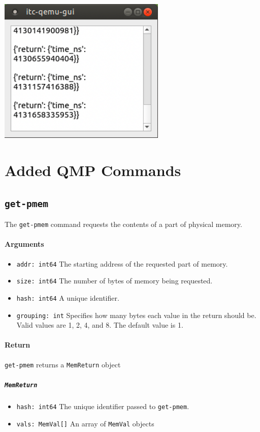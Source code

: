 \documentclass{article}
\newcommand{\code}[1]{\texttt{#1}}
\begin{document}
\begin{center}
    \includegraphics[width=80mm]{images/qmp-monitor-view.png}
\end{center}

\section{Added QMP Commands}

\subsection{\code{get-pmem}} \label{GetPmem}
The \code{get-pmem} command requests the contents of a part of physical memory.
\paragraph{Arguments}
\begin{itemize}
    \item \code{addr: int64}
        \subitem The starting address of the requested part of memory.
    \item \code{size: int64} 
        \subitem The number of bytes of memory being requested.
    \item \code{hash: int64} 
        \subitem A unique identifier.
    \item \code{grouping: int} 
        \subitem Specifies how many bytes each value in the return should be. Valid values are 1, 2, 4, and 8. The default value is 1.
\end{itemize}   
        
\paragraph{Return}
    \code{get-pmem} returns a \code{MemReturn} object
    \subparagraph{\code{MemReturn}}
    \begin{itemize}
        \item \code{hash: int64}
            \subitem The unique identifier passed to \code{get-pmem}.
        \item \code{vals: MemVal[]}
            \subitem An array of \code{MemVal} objects
    \end{itemize}
    
\end{document}
